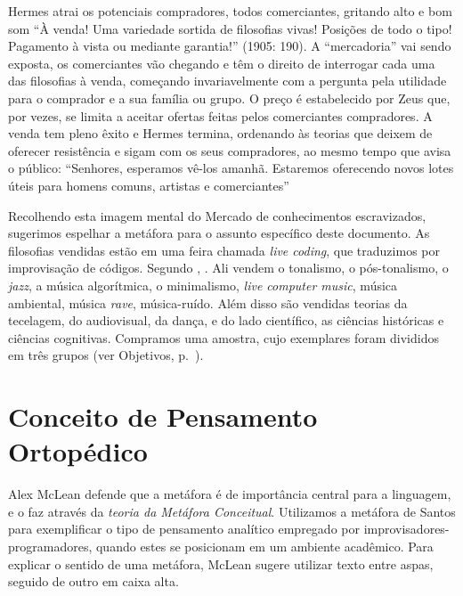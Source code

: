 \begin{citacao}
Hermes atrai os potenciais compradores, todos comerciantes, gritando alto e bom som “À venda! Uma variedade sortida de filosofias vivas! Posições de todo o tipo! Pagamento à vista ou mediante garantia!” (1905: 190). A “mercadoria” vai sendo exposta, os comerciantes vão chegando e têm o direito de interrogar cada uma das filosofias à venda, começando invariavelmente com a pergunta pela utilidade para o comprador e a sua família ou grupo. O preço é estabelecido por Zeus que, por vezes, se limita a aceitar ofertas feitas pelos comerciantes compradores. A venda tem pleno êxito e Hermes termina, ordenando às teorias que deixem de oferecer resistência e sigam com os seus compradores, ao mesmo tempo que avisa o público: “Senhores, esperamos vê-los amanhã. Estaremos oferecendo novos lotes úteis para homens comuns, artistas e comerciantes”   
\end{citacao}

Recolhendo esta imagem mental do Mercado de conhecimentos escravizados, sugerimos espelhar a metáfora para o assunto específico deste documento. As filosofias vendidas estão em uma feira chamada \emph{live coding}, que traduzimos por  improvisação de códigos. Segundo , . Ali vendem o tonalismo, o pós-tonalismo, o \emph{jazz}, a música algorítmica, o minimalismo, \emph{live computer music}, música ambiental, música \emph{rave},  música-ruído. Além disso são vendidas teorias da tecelagem, do audiovisual, da dança, e do lado científico, as ciências históricas e ciências cognitivas. Compramos uma amostra, cujo exemplares foram divididos em três grupos (ver Objetivos, p.~\pageref{sec:objetivos}).


\section*{Conceito de Pensamento Ortopédico}

Alex McLean defende que a metáfora é de importância central para a linguagem, e o faz através da \emph{teoria da Metáfora Conceitual}. Utilizamos a metáfora de Santos para exemplificar o tipo de pensamento analítico empregado por improvisadores-programadores, quando estes se posicionam em um ambiente acadêmico. Para explicar o sentido de uma metáfora, McLean sugere utilizar texto entre aspas, seguido de outro em caixa alta. 

